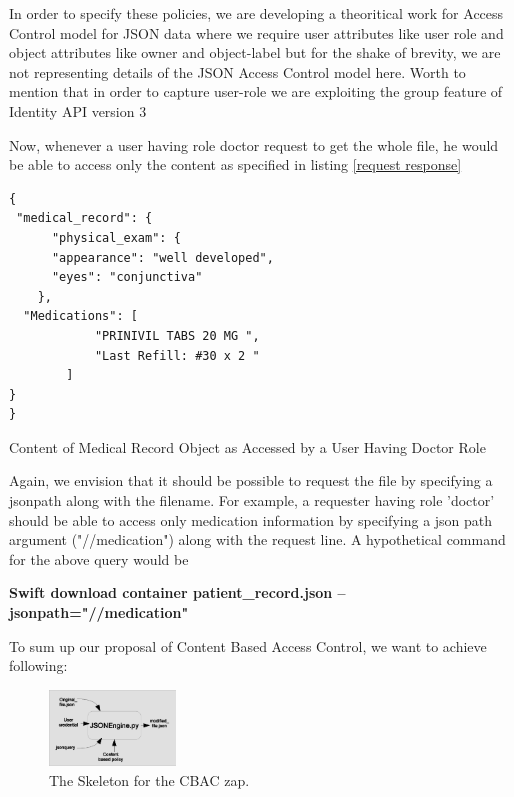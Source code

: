 In order to specify these policies, we are developing a theoritical work for Access Control model for JSON data where we require user attributes like user role and object attributes like owner and object-label but for the shake of brevity, we are not representing details of the JSON Access Control model  here. Worth to mention that in order to capture user-role we are exploiting the group feature of Identity API version 3 \cite{identityv3}

Now, whenever a user having role doctor request to get the whole file, he would be able to access only the content as specified in listing \ref{request response} 

\begin{listing}
\begin{verbatim}
{
 "medical_record": { 
      "physical_exam": {
	  "appearance": "well developed",
	  "eyes": "conjunctiva"
	},
  "Medications": [
            "PRINIVIL TABS 20 MG ",
            "Last Refill: #30 x 2 "
        ]   
}  
}

\end{verbatim}
\caption{Content of  Medical Record Object as Accessed by a User Having Doctor Role} 
\label{request response}
\end{listing}


Again, we envision that it should  be possible to request the file by specifying a jsonpath along with the filename. For example, a requester having role 'doctor' should be able to access only   medication information by specifying a json path argument ("//medication") along with the request line. A hypothetical command for the above query would be 

\textbf{ Swift download container patient\_record.json --jsonpath="//medication" }


To sum up our proposal of Content Based Access Control, we want to achieve following:

\begin{figure}[h!] 
  \centering
    \includegraphics[width=0.3\textwidth]{eps/json_query_zap}
 \caption{The Skeleton for the CBAC zap.}
\label{fig:zappskeleton}
\end{figure}


